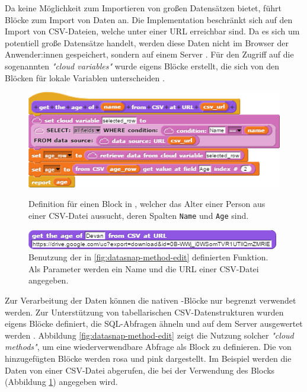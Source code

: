 Da \Snap{} keine Möglichkeit zum Importieren von großen Datensätzen bietet, führt \DataSnap{} Blöcke zum Import von Daten an. Die Implementation beschränkt sich auf den Import von \acs{CSV}-Dateien, welche unter einer URL erreichbar sind. Da es sich um potentiell große Datensätze handelt, werden diese Daten nicht im Browser der Anwender:innen gespeichert, sondern auf einem Server \parencite{hellmannDataSnapEnabling2015}. Für den Zugriff auf die sogenannten \textit{"cloud variables"} wurde eigens Blöcke erstellt, die sich von den Blöcken für lokale Variablen unterscheiden \parencite{hellmannDataSnapEnabling2015}.

\begin{figure}[!ht]
  \begin{minipage}[t]{.52\textwidth}
    \includegraphics[width=\linewidth]{assets/datasnap-method-edit.png}
    \caption[Definition eines Blocks in \DataSnap{}]{Definition für einen Block in \DataSnap{}, welcher das Alter einer Person aus einer \acs{CSV}-Datei aussucht, deren Spalten \texttt{Name} und \texttt{Age} sind.}
    \label{fig:datasnap-method-edit}
  \end{minipage}
  \hfill
  \begin{minipage}[t]{.46\textwidth}
    \includegraphics[width=\linewidth]{assets/datasnap-method-use.png}
    \caption[Benutzung der in Abbildung \ref*{fig:datasnap-method-edit} definierten Funktion]{Benutzung der in \ref{fig:datasnap-method-edit} definierten Funktion. Als Parameter werden ein Name und die \acs{URL} einer \acs{CSV}-Datei angegeben.}
    \label{fig:datasnap-method-use}
  \end{minipage}
\end{figure}

Zur Verarbeitung der Daten können die nativen \Snap{}-Blöcke nur begrenzt verwendet werden. Zur Unterstützung von tabellarischen CSV-Datenstrukturen wurden eigens Blöcke definiert, die \acs{SQL}-Abfragen ähneln und auf dem Server ausgewertet werden \parencite{hellmannDataSnapEnabling2015}. Abbildung \ref{fig:datasnap-method-edit} zeigt die Nutzung solcher \textit{"cloud methods"}, um eine wiederverwendbare Abfrage als Block zu definieren. Die von \DataSnap{} hinzugefügten Blöcke werden rosa und pink dargestellt. Im Beispiel werden die Daten von einer \acs{CSV}-Datei abgerufen, die bei der Verwendung des Blocks (Abbildung \ref{fig:datasnap-method-use}) angegeben wird.

